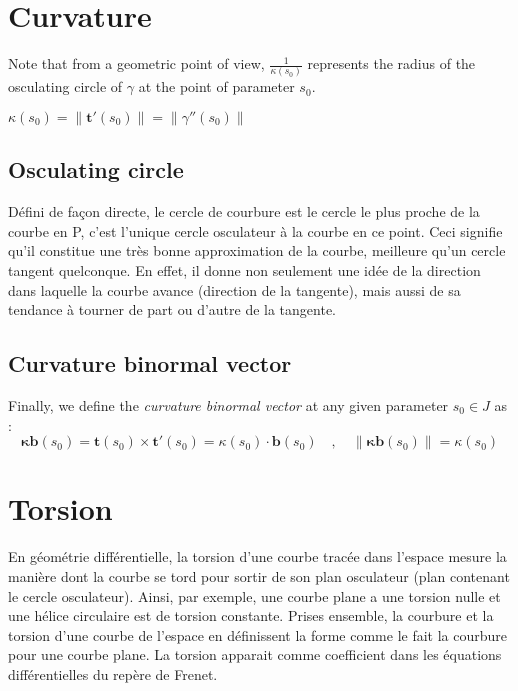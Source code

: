 

\section{Curvature}


Note that from a geometric point of view, $\frac{1}{\kappa(s_0)}$ represents the radius of the osculating circle of $\gamma$ at the point of parameter $s_0$.

$\kappa(s_0) = \|\mathbf{t}'(s_0)\| = \|\gamma''(s_0)\|$

\subsection{Osculating circle}
Défini de façon directe, le cercle de courbure est le cercle le plus proche de la courbe en P, c'est l'unique cercle osculateur à la courbe en ce point. Ceci signifie qu'il constitue une très bonne approximation de la courbe, meilleure qu'un cercle tangent quelconque. En effet, il donne non seulement une idée de la direction dans laquelle la courbe avance (direction de la tangente), mais aussi de sa tendance à tourner de part ou d'autre de la tangente.

\subsection{Curvature binormal vector}
Finally, we define the \emph{curvature binormal vector} at any given parameter $s_0 \in J$ as :
\begin{equation}
\mathbf{\kappa b}(s_0) = \mathbf{t}(s_0) \times \mathbf{t}'(s_0) = \kappa(s_0)\cdot\mathbf{b}(s_0)
\quad,\quad
\|\mathbf{\kappa b}(s_0)\|= \kappa(s_0)
\end{equation}




\section{Torsion}
En géométrie différentielle, la torsion d'une courbe tracée dans l'espace mesure la manière dont la courbe se tord pour sortir de son plan osculateur (plan contenant le cercle osculateur). Ainsi, par exemple, une courbe plane a une torsion nulle et une hélice circulaire est de torsion constante. Prises ensemble, la courbure et la torsion d'une courbe de l'espace en définissent la forme comme le fait la courbure pour une courbe plane. La torsion apparait comme coefficient dans les équations différentielles du repère de Frenet.

